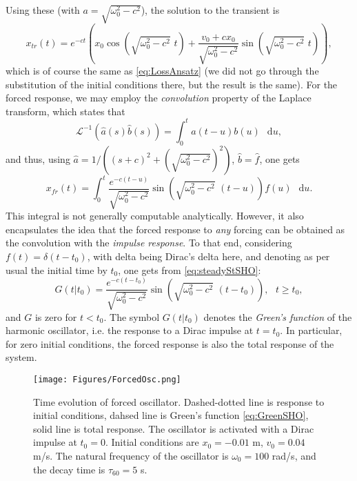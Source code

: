 \documentclass[11pt,twoside,a4paper,english]{book}
\newcommand{\dif}{\mathop{}\!\mathrm{d}}
\begin{document}
Using these (with $a = \sqrt{\omega_0^2-c^2}$), the solution to the transient is
\begin{equation}
    x_{tr}(t) = e^{-ct}\left(x_0 \cos\left(\sqrt{\omega_0^2-c^2}\,\,t\right) + \frac{v_0 + c x_0}{\sqrt{\omega_0^2-c^2}}\sin\left(\sqrt{\omega_0^2-c^2}\,\,t\right)\right),
\end{equation}
which is of course the same as \eqref{eq:LossAnsatz} (we did not go through the substitution of the initial conditions there, but the result is the same). For the forced response, we may employ the \emph{convolution} property of the Laplace transform, which states that
\begin{equation}
    \mathcal{L}^{-1}(\hat a(s)\hat b(s)) = \int_{0}^t a(t-u)b(u) \, \dif u,
\end{equation}
and thus, using $\hat a = 1/((s+c)^2 + (\sqrt{\omega_0^2-c^2})^2)$, $\hat b = \hat f$, one gets
\begin{equation}\label{eq:steadyStSHO}
    x_{fr}(t) = \int_0^t \frac{e^{-c(t-u)}}{\sqrt{\omega_0^2-c^2}}\sin\left(\sqrt{\omega_0^2-c^2}\,\,(t-u)\right) f(u) \, \dif u. 
\end{equation}
This integral is not generally computable analytically. However, it also encapsulates the idea that the forced response to \emph{any} forcing can be obtained as the convolution with the \emph{impulse response}. To that end, considering $f(t)=\delta(t-t_0)$, with delta being Dirac's delta here, and denoting as per usual the initial time by $t_0$, one gets from \eqref{eq:steadyStSHO}:
\begin{equation}\label{eq:GreenSHO}
    G(t|t_0) = \frac{e^{-c(t-t_0)}}{\sqrt{\omega_0^2-c^2}}\sin\left(\sqrt{\omega_0^2-c^2}\,\,(t-t_0)\right), \,\,\,\, t\geq t_0,
\end{equation}
and $G$ is zero for $t<t_0$. The symbol $G(t|t_0)$ denotes the \emph{Green's function} of the harmonic oscillator, i.e. the  response to a Dirac impulse at $t=t_0$. In particular, for zero initial conditions, the forced response is also the total response of the system. 
\begin{figure}
    \centering
    \texttt{[image: Figures/ForcedOsc.png]}
    \caption{Time evolution of forced oscillator. Dashed-dotted line is response to initial conditions, dahsed line is Green's function \eqref{eq:GreenSHO}, solid line is total response. The oscillator is activated with a Dirac impulse at $t_0=0$. Initial conditions are $x_0=-0.01$ m, $v_0=0.04$ m/s. The natural frequency of the oscillator is $\omega_0 = 100$ rad/s, and the decay time is $\tau_{60} = 5$ s.}
\end{figure}
\end{document}
